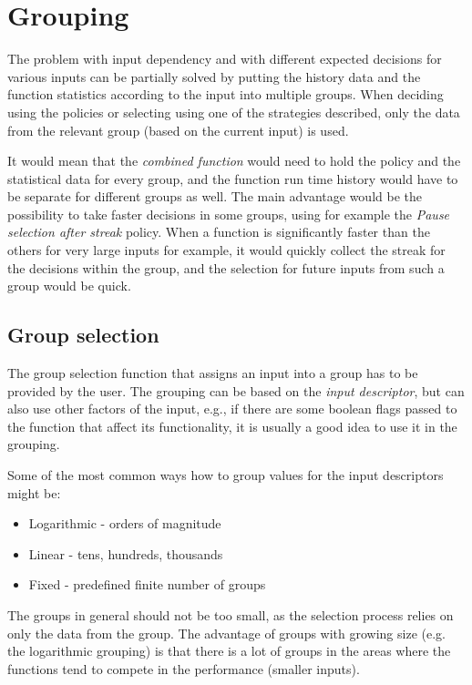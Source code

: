 
\section{Grouping}

The problem with input dependency and with different expected decisions for various inputs can be partially solved by putting the history data and the function statistics according to the input into multiple groups. When deciding using the policies or selecting using one of the strategies described, only the data from the relevant group (based on the current input) is used. 

It would mean that the \textit{combined function} would need to hold the policy and the statistical data for every group, and the function run time history would have to be separate for different groups as well. The main advantage would be the possibility to take faster decisions in some groups, using for example the \textit{Pause selection after streak} policy. When a function is significantly faster than the others for very large inputs for example, it would quickly collect the streak for the decisions within the group, and the selection for future inputs from such a group would be quick.

\subsection{Group selection}

The group selection function that assigns an input into a group has to be provided by the user. The grouping can be based on the \textit{input descriptor}, but can also use other factors of the input, e.g., if there are some boolean flags passed to the function that affect its functionality, it is usually a good idea to use it in the grouping.


Some of the most common ways how to group values for the input descriptors might be:
\begin{itemize}
	\item Logarithmic - orders of magnitude
	\item Linear - tens, hundreds, thousands
	\item Fixed - predefined finite number of groups
\end{itemize}

The groups in general should not be too small, as the selection process relies on only the data from the group. The advantage of groups with growing size (e.g. the logarithmic grouping) is that there is a lot of groups in the areas where the functions tend to compete in the performance (smaller inputs).